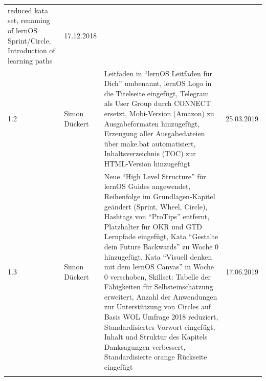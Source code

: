 \documentclass[
  ngerman,
  paper=a4,
,captions=tableheading
]{scrartcl}
\begin{document}
\begin{longtable}[]{@{}llll@{}}
\begin{minipage}[t]{0.53\columnwidth}
reduced kata set, renaming of lernOS Sprint/Circle, Introduction of
learning paths\strut
\end{minipage} & \begin{minipage}[t]{0.11\columnwidth}\raggedright
17.12.2018\strut
\end{minipage}\tabularnewline
\begin{minipage}[t]{0.06\columnwidth}\raggedright
1.2\strut
\end{minipage} & \begin{minipage}[t]{0.19\columnwidth}\raggedright
Simon Dückert\strut
\end{minipage} & \begin{minipage}[t]{0.53\columnwidth}\raggedright
Leitfaden in ``lernOS Leitfaden für Dich'' umbenannt, lernOS Logo in die
Titelseite eingefügt, Telegram als User Group durch CONNECT ersetzt,
Mobi-Version (Amazon) zu Ausgabeformaten hinzugefügt, Erzeugung aller
Ausgabedateien über make.bat automatisiert, Inhaltsverzeichnis (TOC) zur
HTML-Version hinzugefügt\strut
\end{minipage} & \begin{minipage}[t]{0.11\columnwidth}\raggedright
25.03.2019\strut
\end{minipage}\tabularnewline
\begin{minipage}[t]{0.06\columnwidth}\raggedright
1.3\strut
\end{minipage} & \begin{minipage}[t]{0.19\columnwidth}\raggedright
Simon Dückert\strut
\end{minipage} & \begin{minipage}[t]{0.53\columnwidth}\raggedright
Neue ``High Level Structure'' für lernOS Guides angewendet, Reihenfolge
im Grundlagen-Kapitel geändert (Sprint, Wheel, Circle), Hashtags von
``ProTips'' entfernt, Platzhalter für OKR und GTD Lernpfade eingefügt,
Kata ``Gestalte dein Future Backwards'' zu Woche 0 hinzugefügt, Kata
``Visuell denken mit dem lernOS Canvas'' in Woche 0 verschoben,
Skillset: Tabelle der Fähigkeiten für Selbsteinschätzung erweitert,
Anzahl der Anwendungen zur Unterstützung von Circles auf Basis WOL
Umfrage 2018 reduziert, Standardisiertes Vorwort eingefügt, Inhalt und
Struktur des Kapitels Danksagungen verbessert, Standardisierte orange
Rückseite eingefügt\strut
\end{minipage} & \begin{minipage}[t]{0.11\columnwidth}\raggedright
17.06.2019\strut
\end{minipage}\tabularnewline
\begin{minipage}[t]{0.06\columnwidth}\raggedright

\end{minipage}
\end{longtable}
\end{document}

